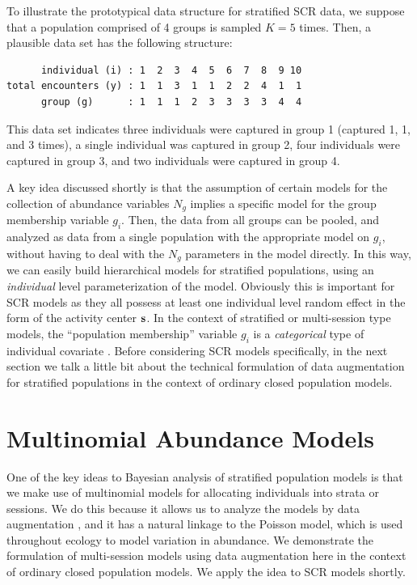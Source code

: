 To illustrate the prototypical data structure for stratified SCR data,
we suppose that a population comprised of 4 groups is sampled
$K=5$ times. Then, a plausible data set has the following structure:
\begin{verbatim}
      individual (i) : 1  2  3  4  5  6  7  8  9 10
total encounters (y) : 1  1  3  1  1  2  2  4  1  1
      group (g)      : 1  1  1  2  3  3  3  3  4  4
\end{verbatim}
This data set indicates three individuals were captured in
group 1 (captured 1, 1, and 3 times), a single individual was
captured in group 2, four individuals were captured in group
3, and two individuals were captured in group 4.

A key idea discussed shortly is that the assumption of certain models
for the collection of abundance variables $N_{g}$ implies a specific
model for the group membership variable $g_{i}$.  Then, the data from
all groups can be pooled, and analyzed as data from a single
population with the appropriate model on $g_{i}$, without having to
deal with the $N_{g}$ parameters in the model directly. In this way,
we can easily build hierarchical models for stratified populations,
using an {\it individual} level parameterization of the
model. Obviously this is important for SCR models as they all possess
at least one individual level random effect in the form of the
activity center ${\bf s}$.  In the context of stratified or
multi-session type models, the ``population membership'' variable
$g_{i}$ is a {\it categorical} type of individual covariate
\citep{huggins:1989, alho:1990, royle:2009}.  Before considering SCR
models specifically, in the next section we talk a little bit about
the technical formulation of data augmentation for stratified
populations in the context of ordinary closed population models.


\section{Multinomial Abundance Models}

One of the key ideas to Bayesian analysis of stratified population
models is that we make use of multinomial models for allocating
individuals into strata or sessions. We do this because it allows us
to analyze the models by data augmentation \citep{converse_royle:2012,
  royle_converse:2013}, and it has a natural linkage to the Poisson
model, which is used throughout ecology to model variation in
abundance. We demonstrate the formulation of multi-session models using
data augmentation here in the context of ordinary closed population
models. We apply the idea to SCR models shortly.

